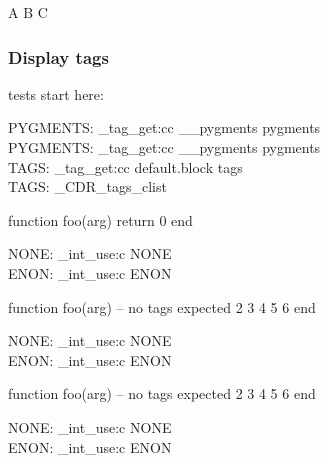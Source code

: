 \bgroup

\begin{CDRBlock} [
  pygments=false,
  tags=none,
  numbers=left,
  firstnumber=last,
]
A
B
C
\end{CDRBlock}

\newpage

\egroup

\subsubsection{Display tags}

\bgroup

tests start here:


\ExplSyntaxOn
PYGMENTS: \CDR_tag_get:cc { __pygments } { pygments } \\
\ExplSyntaxOff
{}
\ExplSyntaxOn
PYGMENTS: \CDR_tag_get:cc { __pygments } { pygments } \\
TAGS: \CDR_tag_get:cc { default.block } { tags } \\
TAGS: \g_CDR_tags_clist \\
\ExplSyntaxOff
\begin{CDRBlock}[
  stepnumber=1,
]
function foo(arg) return 0 end
\end{CDRBlock}

\ExplSyntaxOn
NONE: \CDR_int_use:c { NONE } \\
ENON: \CDR_int_use:c { ENON } \\
\ExplSyntaxOff

\begin{CDRBlock}[
  stepnumber=1,
  firstnumber = last,
]
function foo(arg) -- no tags expected
  2
  3
  4
  5
  6
end
\end{CDRBlock}

\ExplSyntaxOn
NONE: \CDR_int_use:c { NONE } \\
ENON: \CDR_int_use:c { ENON } \\
\ExplSyntaxOff

\begin{CDRBlock}[
  stepnumber=1,
  firstnumber = auto,
]
function foo(arg) -- no tags expected
  2
  3
  4
  5
  6
end
\end{CDRBlock}
\ExplSyntaxOn
NONE: \CDR_int_use:c { NONE } \\
ENON: \CDR_int_use:c { ENON } \\
\ExplSyntaxOff


